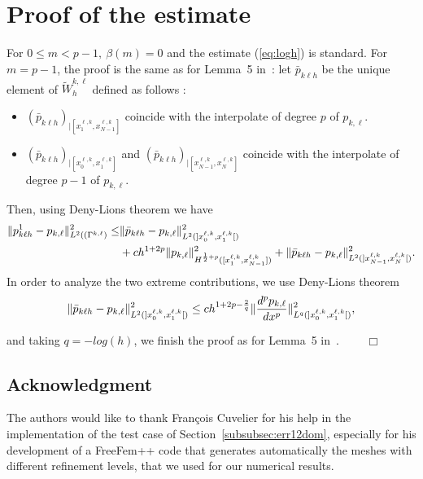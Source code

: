 \documentclass[final]{siamltex}
\begin{document}
\section{Proof of the estimate \pmb{\eqref{eq:logh}}}\label{appendix:B}
For $0\le m < p-1, \ \beta(m)=0$ and the estimate (\ref{eq:logh}) is standard.
For $m=p-1$, the proof is the same as for Lemma~5 in~\cite{JMN10}: let ${\bar p}_{k \ell h}$ be the unique element
of $\tilde W_h^{k,\ell}$ defined as follows :
\begin{itemize}
\item
$({\bar p}_{k \ell h})_{|[x_1^{\ell,k},x_{N-1}^{\ell,k}]}$ coincide
with the interpolate of degree $p$ of $p_{k,\ell}$.
\item
$({\bar p}_{k \ell h})_{|[x_0^{\ell,k},x_{1}^{\ell,k}]}$ and 
$({\bar p}_{k \ell h})_{|[x_{N-1}^{\ell,k},x_{N}^{\ell,k}]}$ coincide
with the interpolate of degree $p-1$ of $p_{k,\ell}$.
\end{itemize}
Then, using Deny-Lions theorem we have
\begin{align*}
\| p^1_{k \ell h} - p_{k,\ell} \|^2_{L^2((\Gamma^{k,\ell})}
\le& \| {\bar p}_{k \ell h} - p_{k,\ell} \|^2_{L^2(]x_0^{\ell,k},x_1^{\ell,k}[)} \\
&+ch^{1+2p}\|p_{k,\ell}\|^2_{H^{{1\over 2}+p}([x_1^{\ell,k},x_{N-1}^{\ell,k}])}
+\| {\bar p}_{k \ell h} - p_{k,\ell} \|^2_{L^2(]x_{N-1}^{\ell,k},x_N^{\ell,k}[)}.
\nonumber
\end{align*}
In order to analyze the two extreme contributions, we use Deny-Lions theorem 
\begin{eqnarray}
\| {\bar p}_{k \ell h} - p_{k,\ell} \|^2_{L^2(]x_0^{\ell,k},x_1^{\ell,k}[)}
\le ch^{1+2p-{2\over q}}\|\frac{d^p p_{k,\ell}}{dx^p}\|^2_{L^{q}(]x_0^{\ell,k},x_1^{\ell,k}[)},
\nonumber
\end{eqnarray}

and taking  $q=-log(h)$, we finish the proof as for Lemma~5 in~\cite{JMN10}.
$\qquad \Box$

\subsection*{Acknowledgment}
The authors would like to thank Fran\c{c}ois Cuvelier for his help in the implementation of the test case of
  Section~\ref{subsubsec:err12dom}, especially
for his development of a FreeFem++ code that generates automatically the meshes with different refinement levels,
that we used for our numerical results.
\end{document}
